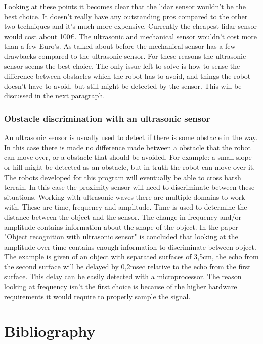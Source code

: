 \documentclass[10pt,a4paper]{article}
\begin{document}
Looking at these points it becomes clear that the lidar sensor wouldn't be the best choice. It doesn't really have any outstanding pros compared to the other two techniques and it's much more expensive. Currently the cheapest lidar sensor would cost about 100$\euro$. The ultrasonic and mechanical sensor wouldn't cost more than a few Euro's. As talked about before the mechanical sensor has a few drawbacks compared to the ultrasonic sensor. For these reasons the ultrasonic sensor seems the best choice. The only issue left to solve is how to sense the difference between obstacles which the robot has to avoid, and things the robot doesn't have to avoid, but still might be detected by the sensor. This will be discussed in the next paragraph.

\subsubsection{Obstacle discrimination with an ultrasonic sensor}
An ultrasonic sensor is usually used to detect if there is some obstacle in the way. In this case there is made no difference made between a obstacle that the robot can move over, or a obstacle that should be avoided. For example: a small slope or hill might be detected as an obstacle, but in truth the robot can move over it. The robots developed for this program will eventually be able to cross harsh terrain. In this case the proximity sensor will need to discriminate between these situations. Working with ultrasonic waves there are multiple domains to work with. These are time, frequency and amplitude. Time is used to determine the distance between the object and the sensor. The change in frequency and/or amplitude contains information about the shape of the object\cite{ultraobject}. 
In the paper "Object recognition with ultrasonic sensor" is concluded 
that looking at the amplitude over time contains enough information to discriminate between object\cite{ultraobject}. The example is given of an object with separated surfaces of 3,5cm, the echo from the second surface will be delayed by 0,2msec relative to the echo from the first surface. This delay can be easily detected with a microprocessor. The reason looking at frequency isn't the first choice is because of the higher hardware requirements it would require to properly sample the signal. 
\\

\newpage

\section{Bibliography}


\end{document}
